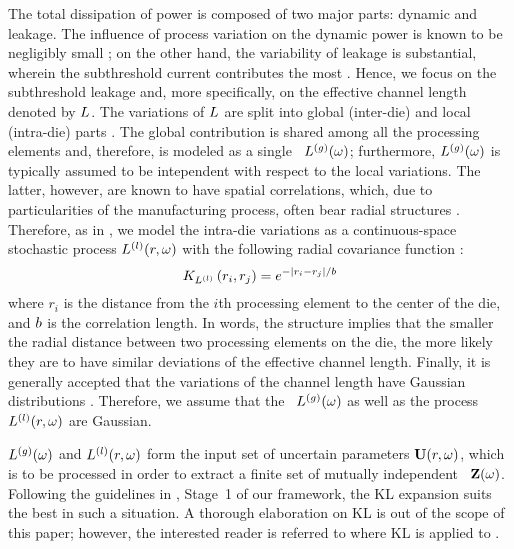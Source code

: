 The total dissipation of power is composed of two major parts: dynamic and leakage. The influence of process variation on the dynamic power is known to be negligibly small \cite{juan2011, juan2012, srivastava2010}; on the other hand, the variability of leakage is substantial, wherein the subthreshold current contributes the most \cite{juan2011, juan2012}. Hence, we focus on the subthreshold leakage and, more specifically, on the effective channel length denoted by $L$. The variations of $L$ are split into global (inter-die) and local (intra-die) parts \cite{chandra2010, juan2011, juan2012, srivastava2010, shen2009}. The global contribution is shared among all the processing elements and, therefore, is modeled as a single \rv\ ${L^{(g)}}(\omega)$; furthermore, ${L^{(g)}}(\omega)$ is typically assumed to be intependent with respect to the local variations. The latter, however, are known to have spatial correlations, which, due to particularities of the manufacturing process, often bear radial structures \cite{friedberg2005, cheng2011}. Therefore, as in \cite{ghanta2006}, we model the intra-die variations as a continuous-space stochastic process $L^{(l)}(r, \omega)$ with the following radial covariance function \cite{ghanem1991}:
\begin{equation} \elabel{covariance-function}
  \fCov{\lLeff}{r_i, r_j} = e^{-|r_i - r_j|/\corrLength}
\end{equation}
where $r_i$ is the distance from the $i$th processing element to the center of the die, and $b$ is the correlation length. In words, the structure implies that the smaller the radial distance between two processing elements on the die, the more likely they are to have similar deviations of the effective channel length. Finally, it is generally accepted that the variations of the channel length have Gaussian distributions \cite{juan2011, juan2012, srivastava2010}. Therefore, we assume that the \rv\ ${L^{(g)}}(\omega)$ as well as the process $L^{(l)}(r, \omega)$ are Gaussian.

${L^{(g)}}(\omega)$ and $L^{(l)}(r, \omega)$ form the input set of uncertain parameters $\mathbf{U}(r, \omega)$, which is to be processed in order to extract a finite set of mutually independent \rvs\ $\mathbf{Z}(\omega)$. Following the guidelines in , Stage~1 of our framework, the KL expansion suits the best in such a situation. A thorough elaboration on KL is out of the scope of this paper; however, the interested reader is referred to  where KL is applied to .
